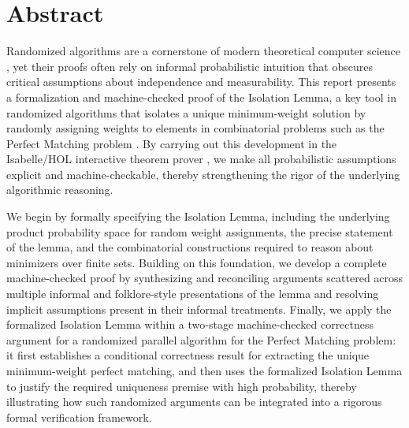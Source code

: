 \chapter*{Abstract}

Randomized algorithms are a cornerstone of modern theoretical computer science \cite{motwani1995randomized}, yet their proofs often rely on informal probabilistic intuition that obscures critical assumptions about independence and measurability.
This report presents a formalization and machine-checked proof of the Isolation Lemma, a key tool in randomized algorithms that isolates a unique minimum-weight solution by randomly assigning weights to elements in combinatorial problems such as the Perfect Matching problem \cite{mulmuley1987matching,lovasz1979determinants}.
By carrying out this development in the Isabelle/HOL interactive theorem prover \cite{nipkow2002isabelle,isabelleprob}, we make all probabilistic assumptions explicit and machine-checkable, thereby strengthening the rigor of the underlying algorithmic reasoning.

We begin by formally specifying the Isolation Lemma, including the underlying product probability space for random weight assignments, the precise statement of the lemma, and the combinatorial constructions required to reason about minimizers over finite sets.
Building on this foundation, we develop a complete machine-checked proof by synthesizing and reconciling arguments scattered across multiple informal and folklore-style presentations of the lemma and resolving implicit assumptions present in their informal treatments.
Finally, we apply the formalized Isolation Lemma within a two-stage machine-checked correctness argument for a randomized parallel algorithm for the Perfect Matching problem:
it first establishes a conditional correctness result for extracting the unique minimum-weight perfect matching, and then uses the formalized Isolation Lemma to justify the required uniqueness premise with high probability, thereby illustrating how such randomized arguments can be integrated into a rigorous formal verification framework.